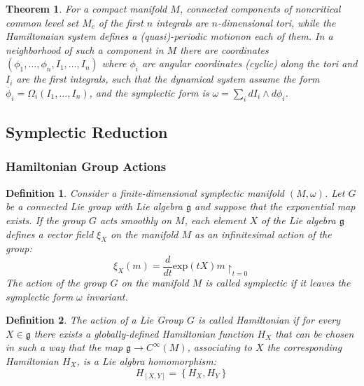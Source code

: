 \documentclass{article}
\newtheorem{thm}{Theorem}
\newtheorem{defn}{Definition}
\begin{document}
\begin{thm}

	For a compact manifold $M$, connected components of noncritical common level set $M_c$ of the first $n$ integrals are $n$-dimensional tori, while the Hamiltonaian system defines a (quasi)-periodic motionon each of them. In a neighborhood of such a component in $M$ there are coordinates $ \left( \phi_1, \ldots, \phi_n, I_1, \ldots, I_n \right)$ where $ \phi_i$ are angular coordinates (cyclic) along the tori and $I_i$ are the first integrals, such that the dynamical system assume the form $ \dot{ \phi_i} = \Omega_i (I_1, \ldots, I_n)$, and the symplectic form is $ \omega = \sum_i dI_i \wedge d \phi_i$.

\end{thm}

\subsection{Symplectic Reduction}
\subsubsection{Hamiltonian Group Actions}

\begin{defn}

	Consider a finite-dimensional symplectic manifold $ \left( M, \omega \right)$. Let $G$ be a connected Lie group with Lie algebra $ \mathfrak{g}$ and suppose that the exponential map exists. If the group $G$ acts smoothly on $M$, each element $X$ of the Lie algebra $ \mathfrak{g}$ defines a vector field $ \xi_X$ on the manifold $M$ as an infinitesimal action of the group:
	\[
		\xi_X(m) = \frac{d}{dt} \mathrm{exp}(tX)m \restriction_{t=0}
	\]
The \textit{action} of the group $G$ on the manifold $M$ is called \textit{symplectic} if it leaves the symplectic form $ \omega$ invariant.	

\end{defn}

\begin{defn}

The \textit{action} of a Lie Group $G$ is called \textit{Hamiltonian} if for every $X \in \mathfrak{g}$ there exists a globally-defined Hamiltonian function $H_X$ that can be chosen in such a way that the map $ \mathfrak{g} \to C^{\infty}( M ) $, associating to $X$ the corresponding Hamiltonian $H_X$, is a Lie algbra homomorphism:
\[
	H_{ \left[ X,Y \right] } = \left\{ H_X, H_Y \right\}
\]
\end{defn}
\end{document}
